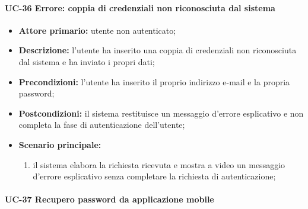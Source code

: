 \paragraph{UC-36 Errore: coppia di credenziali non riconosciuta dal sistema}

	\begin{itemize}
		\item \textbf{Attore primario:} utente non autenticato;

		\item \textbf{Descrizione:} l'utente ha inserito una coppia di credenziali non riconosciuta dal sistema e ha inviato i propri dati;

		\item \textbf{Precondizioni:} l'utente ha inserito il proprio indirizzo e-mail e la propria password;

		\item \textbf{Postcondizioni:} il sistema restituisce un messaggio d'errore esplicativo e non completa la fase di autenticazione dell'utente;

		\item \textbf{Scenario principale:}
	  		\begin{enumerate}
		  		\item il sistema elabora la richiesta ricevuta e mostra a video un messaggio d'errore esplicativo senza completare la richiesta di autenticazione; 
	  		\end{enumerate}
	\end{itemize}

\paragraph{UC-37 Recupero password da applicazione mobile}

